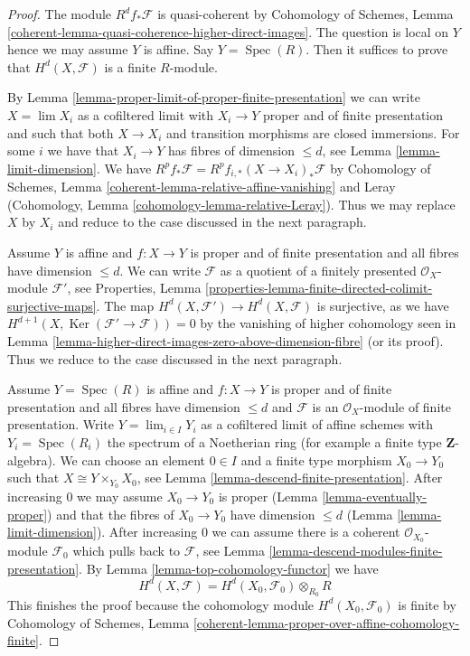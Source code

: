 \documentclass{stacks-project}
\theoremstyle{plain}
\theoremstyle{definition}
\theoremstyle{remark}
\numberwithin{equation}{subsection}
\def\lim{\mathop{\mathrm{lim}}\nolimits}
\def\Spec{\mathop{\mathrm{Spec}}}
\def\Ker{\mathop{\mathrm{Ker}}}
\begin{document}
\begin{proof}
The module $R^df_*\mathcal{F}$ is quasi-coherent by
Cohomology of Schemes, Lemma
\ref{coherent-lemma-quasi-coherence-higher-direct-images}.
The question is local on $Y$ hence we may assume $Y$ is affine.
Say $Y = \Spec(R)$. Then it suffices to prove that $H^d(X, \mathcal{F})$
is a finite $R$-module.

\medskip\noindent
By Lemma \ref{lemma-proper-limit-of-proper-finite-presentation}
we can write $X = \lim X_i$ as a cofiltered limit with $X_i \to Y$ proper
and of finite presentation and such that both $X \to X_i$
and transition morphisms are closed immersions.
For some $i$ we have that $X_i \to Y$ has fibres of dimension $\leq d$,
see Lemma \ref{lemma-limit-dimension}. We have
$R^pf_*\mathcal{F} = R^pf_{i, *}(X \to X_i)_*\mathcal{F}$ by
Cohomology of Schemes, Lemma \ref{coherent-lemma-relative-affine-vanishing}
and Leray (Cohomology, Lemma \ref{cohomology-lemma-relative-Leray}).
Thus we may replace $X$ by $X_i$ and
reduce to the case discussed in the next paragraph.

\medskip\noindent
Assume $Y$ is affine and $f : X \to Y$ is proper and of finite presentation
and all fibres have dimension $\leq d$.
We can write $\mathcal{F}$ as a quotient of a finitely presented
$\mathcal{O}_X$-module $\mathcal{F}'$, see
Properties, Lemma
\ref{properties-lemma-finite-directed-colimit-surjective-maps}.
The map $H^d(X, \mathcal{F}') \to H^d(X, \mathcal{F})$ is
surjective, as we have $H^{d + 1}(X, \Ker(\mathcal{F}' \to \mathcal{F})) = 0$
by the vanishing of higher cohomology seen in
Lemma \ref{lemma-higher-direct-images-zero-above-dimension-fibre}
(or its proof). Thus we reduce to the case discussed in the next paragraph.

\medskip\noindent
Assume $Y = \Spec(R)$ is affine and $f : X \to Y$
is proper and of finite presentation
and all fibres have dimension $\leq d$ and $\mathcal{F}$ is an
$\mathcal{O}_X$-module of finite presentation.
Write $Y = \lim_{i \in I} Y_i$ as a cofiltered limit of affine schemes
with $Y_i = \Spec(R_i)$ the spectrum of a Noetherian ring
(for example a finite type $\mathbf{Z}$-algebra).
We can choose an element $0 \in I$ and a finite type morphism
$X_0 \to Y_0$ such that $X \cong Y \times_{Y_0} X_0$, see
Lemma \ref{lemma-descend-finite-presentation}.
After increasing $0$ we may assume $X_0 \to Y_0$ is proper
(Lemma \ref{lemma-eventually-proper})
and that the fibres of $X_0 \to Y_0$ have dimension $\leq d$
(Lemma \ref{lemma-limit-dimension}).
After increasing $0$ we can assume there is a coherent
$\mathcal{O}_{X_0}$-module $\mathcal{F}_0$ which pulls
back to $\mathcal{F}$, see
Lemma \ref{lemma-descend-modules-finite-presentation}.
By Lemma \ref{lemma-top-cohomology-functor}
we have
$$
H^d(X, \mathcal{F}) = H^d(X_0, \mathcal{F}_0) \otimes_{R_0} R
$$
This finishes the proof because the cohomology module
$H^d(X_0, \mathcal{F}_0)$ is finite by
Cohomology of Schemes, Lemma
\ref{coherent-lemma-proper-over-affine-cohomology-finite}.
\end{proof}
\end{document}
